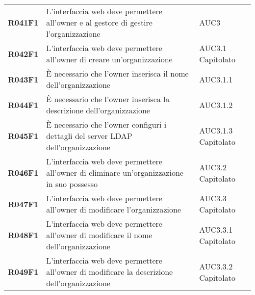 \documentclass[../analisi-dei-requisiti.tex]{subfiles}
\begin{document}
\begin{longtable}[H]{>{\centering\bfseries}m{3cm} >{\centering}m{10cm} >{\centering\arraybackslash}m{3cm}}
  R041F1                  & L'interfaccia web deve permettere all'owner e al gestore di gestire l'organizzazione                                                                                               & AUC3                          \\
  R042F1                  & L'interfaccia web deve permettere all'owner di creare un'organizzazione                                                                                                            & AUC3.1 Capitolato             \\
  R043F1                  & È necessario che l'owner inserisca il nome dell'organizzazione                                                                                                                     & AUC3.1.1                      \\
  R044F1                  & È necessario che l'owner inserisca la descrizione dell'organizzazione                                                                                                              & AUC3.1.2                      \\
  R045F1                  & È necessario che l'owner configuri i dettagli del server LDAP dell'organizzazione                                                                                                  & AUC3.1.3 Capitolato           \\
  R046F1                  & L'interfaccia web deve permettere all'owner di eliminare un'organizzazione in suo possesso                                                                                         & AUC3.2 Capitolato             \\
  R047F1                  & L'interfaccia web deve permettere all'owner di modificare l'organizzazione                                                                                                         & AUC3.3 Capitolato             \\
  R048F1                  & L'interfaccia web deve permettere all'owner di modificare il nome dell'organizzazione                                                                                              & AUC3.3.1 Capitolato           \\
  R049F1                  & L'interfaccia web deve permettere all'owner di modificare la descrizione dell'organizzazione                                                                                       & AUC3.3.2 Capitolato           \\

\end{longtable}
\end{document}
